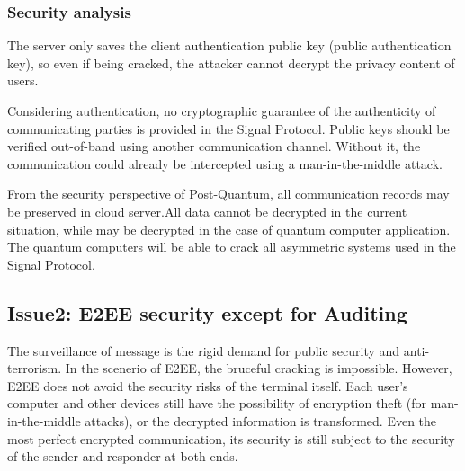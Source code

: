 \documentclass[11pt,en]{elegantpaper}
\begin{document}
\subsubsection*{Security analysis}

The server only saves the client authentication public key (public authentication key), so even if being cracked, the attacker cannot decrypt the privacy content of users.

Considering authentication, no cryptographic guarantee of the authenticity of communicating parties is provided in the Signal Protocol. Public keys should be verified out-of-band using another communication channel. Without it, the communication could already be intercepted using a man-in-the-middle attack.

From the security perspective of Post-Quantum, all communication records may be preserved in cloud server.All data cannot be decrypted in the current situation, while may be decrypted in the case of quantum computer application. The quantum computers will be able to crack all asymmetric systems used in the Signal Protocol.

\subsection{Issue2: E2EE security except for Auditing}


The surveillance of message is the rigid demand for public security and anti-terrorism. In the scenerio of E2EE, the bruceful cracking is impossible. However, E2EE does not avoid the security risks of the terminal itself. Each user's computer and other devices still have the possibility of encryption theft (for man-in-the-middle attacks), or the decrypted information is transformed. Even the most perfect encrypted communication, its security is still subject to the security of the sender and responder at both ends.
\end{document}
